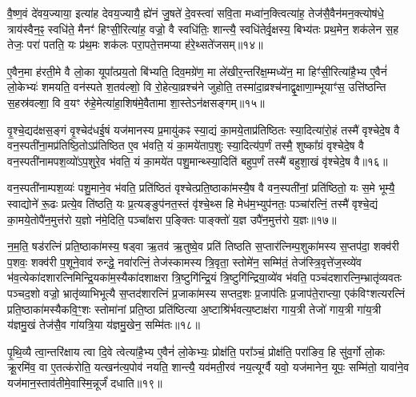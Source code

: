 वै॒ष्ण॒वं दे॑वय॒ज्याया॒ इत्या॑ह देवय॒ज्यायै॒ ह्ये॑नं जु॒षते॑ दे॒वस्त्वा॑ सवि॒ता मध्वा॑न॒क्त्वित्या॑ह॒ तेज॑सै॒वैन॑मन॒क्त्योष॑धे॒ त्राय॑स्वैन॒ꣴ॒ स्वधि॑ते॒ मैनꣳ॑ हिꣳसी॒रित्या॑ह॒ वज्रो॒ वै स्वधि॑तिः॒ शान्त्यै॒ स्वधि॑तेर्वृ॒क्षस्य॒ बिभ्य॑तः प्रथ॒मेन॒ शक॑लेन स॒ह तेजः॒ परा॑ पतति॒ यः प्र॑थ॒मः शक॑लः परा॒पते॒त्तमप्या ह॑रे॒थ्सते॑जसम्॥१४॥

ए॒वैन॒मा ह॑रती॒मे वै लो॒का यूपा᳚त्प्रय॒तो बि॑भ्यति॒ दिव॒मग्रे॑ण॒ मा ले॑खीर॒न्तरि॑क्ष॒म्मध्ये॑न॒ मा हिꣳ॑सी॒रित्या॑है॒भ्य ए॒वैनं॑ लो॒केभ्यः॑ शमयति॒ वन॑स्पते श॒तव॑ल्\mbox{}शो॒ वि रो॒हेत्या॒व्रश्च॑ने जुहोति॒ तस्मा॑दा॒व्रश्च॑नाद्वृ॒क्षाणा॒म्भूयाꣳ॑स॒ उत्ति॑ष्ठन्ति स॒हस्र॑वल्\mbox{}शा॒ वि व॒यꣳ रु॑हे॒मेत्या॑हा॒शिष॑मे॒वैतामा शा॒स्ते\-ऽन॑क्षसङ्गम्॥१५॥

वृ॒श्चे॒द्यद॑क्षस॒ङ्गं वृ॒श्चेद॑धई॒षं यज॑मानस्य प्र॒मायु॑कꣴ स्या॒द्यं का॒मये॒ताप्र॑तिष्ठितः स्या॒दित्या॑रो॒हं तस्मै॑ वृश्चेदे॒ष वै वन॒स्पती॑ना॒मप्र॑तिष्ठि॒तो\-ऽप्र॑तिष्ठित ए॒व भ॑वति॒ यं का॒मये॑ताप॒शुः स्या॒दित्य॑प॒र्णं तस्मै॒ शुष्का᳚ग्रं वृश्चेदे॒ष वै वन॒स्पती॑नामपश॒व्यो॑\-ऽप॒शुरे॒व भ॑वति॒ यं का॒मये॑त पशु॒मान्थ्स्या॒दिति॑ बहुप॒र्णं तस्मै॑ बहुशा॒खं वृ॑श्चेदे॒ष वै॥१६॥

वन॒स्पती॑नाम्पश॒व्यः॑ पशु॒माने॒व भ॑वति॒ प्रति॑ष्ठितं वृश्चेत्प्रति॒ष्ठाका॑मस्यै॒ष वै वन॒स्पती॑नां॒ प्रति॑ष्ठितो॒ यः स॒मे भूम्यै॒ स्वाद्योने॑ रू॒ढः प्रत्ये॒व ति॑ष्ठति॒ यः प्र॒त्यङ्ङुप॑नत॒स्तं वृ॑श्चे॒थ्स हि मेध॑म॒भ्युप॑नतः॒ पञ्चा॑रत्निं॒ तस्मै॑ वृश्चे॒द्यं का॒मये॒तोपै॑न॒मुत्त॑रो य॒ज्ञो न॑मे॒दिति॒ पञ्चा᳚क्षरा प॒ङ्क्तिः पाङ्क्तो॑ य॒ज्ञ उपै॑न॒मुत्त॑रो य॒ज्ञः॥१७॥

न॒म॒ति॒ षड॑रत्निं प्रति॒ष्ठाका॑मस्य॒ षड्वा ऋ॒तव॑ ऋ॒तुष्वे॒व प्रति॑ तिष्ठति स॒प्तार॑त्निम्प॒शुका॑मस्य स॒प्तप॑दा॒ शक्व॑री प॒शवः॒ शक्व॑री प॒शूने॒वाव॑ रुन्द्धे॒ नवा॑रत्निं॒ तेज॑स्कामस्य त्रि॒वृता॒ स्तोमे॑न॒ सम्मि॑तं॒ तेज॑स्त्रि॒वृत्ते॑ज॒स्व्ये॑व भ॑व॒त्येका॑दशारत्नि\-मिन्द्रि॒यका॑म॒स्यैका॑दशाक्षरा त्रि॒ष्टुगि॑न्द्रि॒यं त्रि॒ष्टुगि॑न्द्रिया॒व्ये॑व भ॑वति॒ पञ्च॑दशारत्नि॒म्भ्रातृ॑व्यवतः पञ्चद॒शो वज्रो॒ भ्रातृ॑व्याभिभूत्यै स॒प्तद॑शारत्निं प्र॒जाका॑मस्य सप्तद॒शः प्र॒जाप॑तिः प्र॒जाप॑ते॒राप्त्या॒ एक॑विꣳशत्यरत्निं प्रति॒ष्ठाका॑मस्यैक\-वि॒ꣳ॒शः स्तोमा॑नां प्रति॒ष्ठा प्रति॑ष्ठित्या अ॒ष्टाश्रि॑र्भवत्य॒ष्टाक्ष॑रा गाय॒त्री तेजो॑ गाय॒त्री गा॑य॒त्री य॑ज्ञमु॒खं तेज॑सै॒व गा॑यत्रि॒या य॑ज्ञमु॒खेन॒ सम्मि॑तः॥१८॥

{\anuvakamend[{जु॒षे॒ सते॑जस॒मन॑क्षसङ्गं बहुशा॒खं वृ॑श्चेदे॒ष वै य॒ज्ञ उपै॑न॒मुत्त॑रो य॒ज्ञ आप्त्या॒ एका॒न्नविꣳ॑श॒तिश्च॑}]}%

पृ॒थि॒व्यै त्वा॒न्तरि॑क्षाय त्वा दि॒वे त्वेत्या॑है॒भ्य ए॒वैनं॑ लो॒केभ्यः॒ प्रोक्ष॑ति॒ परा᳚ञ्चं॒ प्रोक्ष॑ति॒ परा॑ङिव॒ हि सु॑व॒र्गो लो॒कः क्रू॒रमि॑व॒ वा ए॒तत्क॑रोति॒ यत्खन॑त्य॒पोव॑ नयति॒ शान्त्यै॒ यव॑मती॒रव॑ नय॒त्यूर्ग्वै यवो॒ यज॑मानेन॒ यूपः॒ सम्मि॑तो॒ यावा॑ने॒व यज॑मान॒स्ताव॑तीमे॒वास्मि॒न्नूर्जं॑ दधाति॥१९॥

